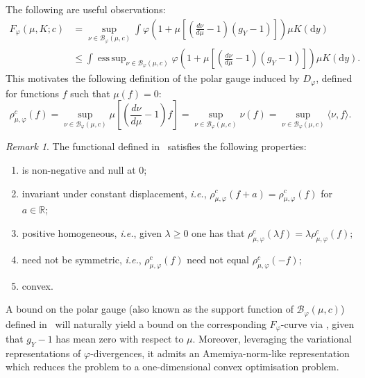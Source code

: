 \documentclass[11pt]{article}
\newcommand{\B}{\mathcal{B}}
\DeclareMathOperator*{\esssup}{ess\,sup}
\theoremstyle{plain}
\theoremstyle{remark}
\newtheorem{remark}{Remark}
\begin{document}
    The following are useful observations:
    \begin{align}
        F_\varphi(\mu, K;c) &= \sup_{\nu \in \B_\varphi(\mu,c)} \int \varphi\left(1+\mu \left[\left(\frac{d\nu}{d\mu}-1\right)\left(g_Y-1\right)\right]\right) \mu K(\mathrm{d}y) \\
        &\leq \int \esssup_{\nu \in \B_\varphi(\mu,c)}\varphi\left(1+\mu \left[\left(\frac{d\nu}{d\mu}-1\right)\left(g_Y-1\right)\right]\right) \mu K(\mathrm{d}y).\label{eq:gaugeInFphi}
    \end{align}
    This motivates the following definition of the polar gauge induced by $D_\varphi$, defined for functions $f$ such that $\mu(f)=0$:
   \begin{equation}
       \rho_{\mu,\varphi}^c(f) = \sup_{\nu \in \B_\varphi(\mu,c)} \mu\left[\left(\frac{d\nu}{d\mu}-1\right)f\right] = \sup_{\nu \in \B_\varphi(\mu,c)} \nu(f) = \sup_{\nu \in \B_\varphi(\mu,c)} \langle \nu, f \rangle  . \label{eq:polarGauge}
   \end{equation}
   \begin{remark}
       The functional defined in~ satisfies the following properties:
        \begin{enumerate}
        \item is non-negative and null at 0; \label{it:nonNeg}
        \item invariant under constant displacement, \textit{i.e.}, $\rho^c_{\mu,\varphi}(f+a)= \rho^c_{\mu,\varphi}(f)$ for $a \in \mathbb{R}$;
        \item positive homogeneous, \textit{i.e.}, given $\lambda\geq 0$ one has that $\rho^c_{\mu,\varphi}(\lambda f) = \lambda \rho^c_{\mu,\varphi}(f);$\label{it:posHom}
      
        \item need not be symmetric, \textit{i.e.}, $\rho^c_{\mu,\varphi}(f)$ need not equal $\rho^c_{\mu,\varphi}(-f)$;
        \item convex. \label{it:convex}
    \end{enumerate}
   \end{remark}
   A bound on the polar gauge (also known as the support function of $\B_\varphi(\mu,c)$) defined in~ will naturally yield a bound on the corresponding $F_\varphi$-curve via , given that $g_Y-1$ has mean zero with respect to $\mu$.
   Moreover, leveraging the variational representations of $\varphi$-divergences, it admits an Amemiya-norm-like representation which reduces the problem to a one-dimensional convex optimisation problem. 
\end{document}

